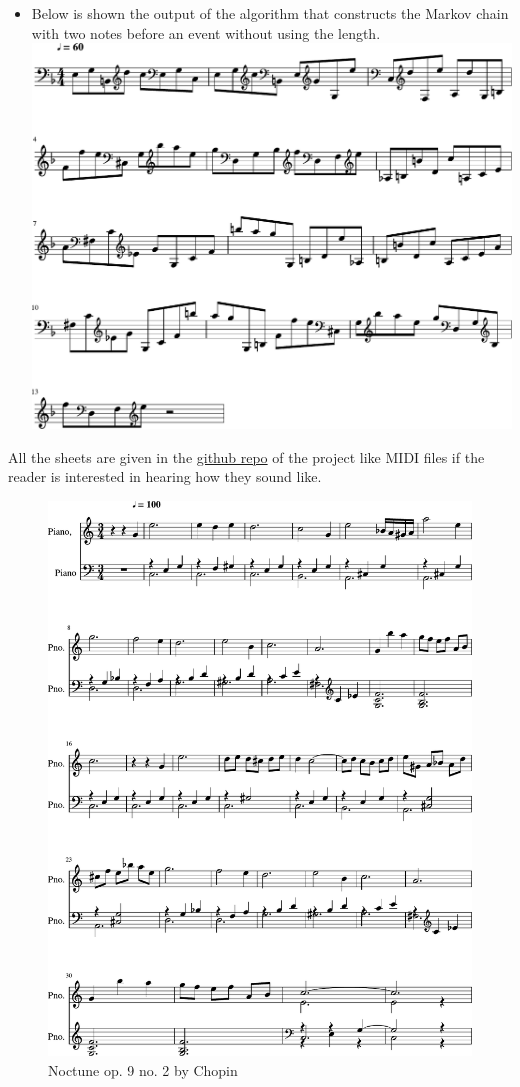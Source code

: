\documentclass[]{article}
\begin{document}
\begin{itemize}
            \item Below is shown the output of the algorithm that constructs the Markov chain with two notes before an event without using the length.\\
            \includegraphics[scale=0.6]{result_pair_notes}
        \end{itemize} 
        All the sheets are given in the \href{https://github.com/Ro6afF/compmus/tree/master/doc}{github repo} of the project like MIDI files if the reader is interested in hearing how they sound like.
        \begin{figure}[h!]
            \includegraphics[scale=0.7]{original}
            \caption{Noctune op. 9 no. 2 by Chopin}
            \label{fig:original}
        \end{figure}
\end{document}
